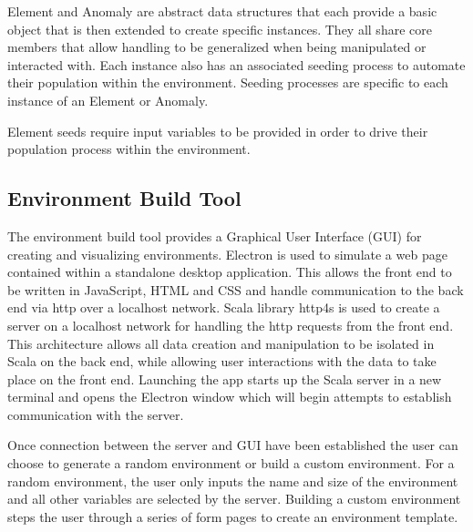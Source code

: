 \documentclass[]{report}
\begin{document}
Element and Anomaly are abstract data structures that each provide a basic object that is then extended to create specific instances.
They all share core members that allow handling to be generalized when being manipulated or interacted with.
Each instance also has an associated seeding process to automate their population within the environment.
Seeding processes are specific to each instance of an Element or Anomaly.

Element seeds require input variables to be provided in order to drive their population process within the environment.

\subsection{Environment Build Tool}
The environment build tool provides a Graphical User Interface (GUI) for creating and visualizing environments.
Electron  is used to simulate a web page contained within a standalone desktop application.
This allows the front end to be written in JavaScript, HTML and CSS and handle communication to the back end via http over a localhost network.
Scala library http4s  is used to create a server on a localhost network for handling the http requests from the front end.
This architecture allows all data creation and manipulation to be isolated in Scala on the back end, while allowing user interactions with the data to take place on the front end.
Launching the app starts up the Scala server in a new terminal and opens the Electron window which will begin attempts to establish communication with the server.

Once connection between the server and GUI have been established the user can choose to generate a random environment or build a custom environment. 
For a random environment, the user only inputs the name and size of the environment and all other variables are selected by the server.
Building a custom environment steps the user through a series of form pages to create an environment template.
\end{document}
